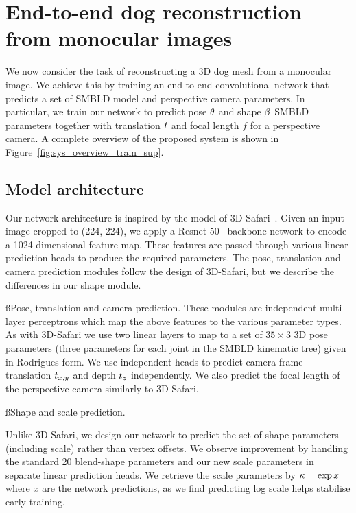   
  
  \section{End-to-end dog reconstruction from monocular images} 
  
  We now consider the task of reconstructing a 3D dog mesh from a monocular image. We achieve this by training an end-to-end convolutional network that predicts a set of SMBLD model and perspective camera parameters. In particular, we train our network to predict pose $\theta$ and shape $\beta$ SMBLD parameters together with translation $t$ and focal length $f$ for a perspective camera. A complete overview of the proposed system is shown in Figure~\ref{fig:sys_overview_train_sup}.
  
  \subsection{Model architecture}
  
  Our network architecture is inspired by the model of 3D-Safari~\cite{Zuffi19Safari}. Given an input image cropped to (224, 224), we apply a Resnet-50~\cite{he2016deep} backbone network to encode a 1024-dimensional feature map. These features are passed through various linear prediction heads to produce the required parameters. The pose, translation and camera prediction modules follow the design of 3D-Safari, but we describe the differences in our shape module.
  
  \ss{Pose, translation and camera prediction.}
  These modules are independent multi-layer perceptrons which map the above features to the various parameter types. As with 3D-Safari we use two linear layers to map to a set of $35 \times 3$ 3D pose parameters (three parameters for each joint in the SMBLD kinematic tree) given in Rodrigues form. We use independent heads to predict camera frame translation $t_{x,y}$ and depth $t_{z}$ independently. We also predict the focal length of the perspective camera similarly to 3D-Safari.
  
  \ss{Shape and scale prediction.}
  
  Unlike 3D-Safari, we design our network to predict the set of shape parameters (including scale) rather than vertex offsets. We observe improvement by handling the standard 20 blend-shape parameters and our new scale parameters in separate linear prediction heads. We retrieve the scale parameters by $\kappa = \exp{x}$ where $x$ are the network predictions, as we find predicting log scale helps stabilise early training.
  
